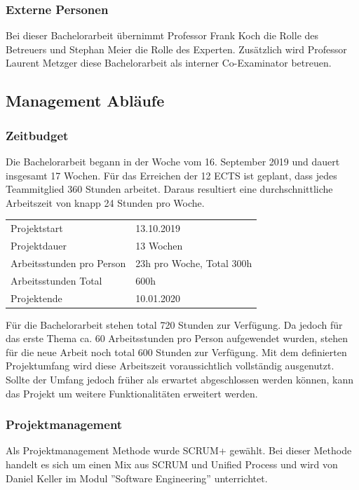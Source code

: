 \subsubsection*{Externe Personen}
Bei dieser Bachelorarbeit übernimmt Professor Frank Koch die Rolle des Betreuers und Stephan Meier die Rolle des Experten. Zusätzlich wird Professor Laurent Metzger diese Bachelorarbeit als interner Co-Examinator betreuen.

\newpage
\subsection{Management Abläufe}
\subsubsection*{Zeitbudget}
Die Bachelorarbeit begann in der Woche vom  16. September 2019 und dauert insgesamt 17 Wochen. Für das Erreichen der 12 ECTS ist geplant, dass jedes Teammitglied 360 Stunden arbeitet. Daraus resultiert eine durchschnittliche Arbeitszeit von knapp 24 Stunden pro Woche.

\begin{table}[h]
	\centering
	\begin{tabu} to 0.9\textwidth {l X}
	\toprule
	Projektstart & 13.10.2019 \\
	Projektdauer & 13 Wochen \\
	Arbeitsstunden pro Person & 23h pro Woche, Total 300h \\
	Arbeitsstunden Total & 600h \\
	Projektende & 10.01.2020 \\ 
	\bottomrule
	\end{tabu}
\end{table}


\noindent Für die Bachelorarbeit stehen total 720 Stunden zur Verfügung. Da jedoch für das erste Thema ca. 60 Arbeitsstunden pro Person aufgewendet wurden, stehen für die neue Arbeit noch total 600 Stunden zur Verfügung. Mit dem definierten Projektumfang wird diese Arbeitszeit voraussichtlich vollständig ausgenutzt. Sollte der Umfang jedoch früher als erwartet abgeschlossen werden können, kann das Projekt um weitere Funktionalitäten erweitert werden.

\subsubsection*{Projektmanagement}
Als Projektmanagement Methode wurde SCRUM+ gewählt. Bei dieser Methode handelt es sich um einen Mix aus SCRUM und Unified Process und wird von Daniel Keller im Modul ''Software Engineering'' unterrichtet.

